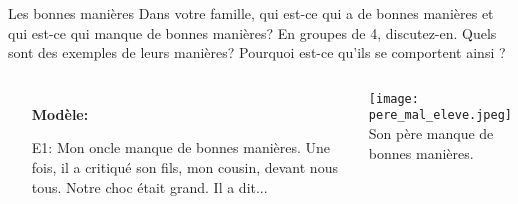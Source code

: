 \begin{frame}{Les bonnes manières}
  Dans votre famille, qui est-ce qui a de bonnes manières et qui est-ce qui manque de bonnes manières?
  En groupes de 4, discutez-en.
  Quels sont des exemples de leurs manières?
  Pourquoi est-ce qu'ils se comportent ainsi ?
  \begin{columns}
      \begin{itemize}
        \item[] \textbf{Modèle:}
        \item[E1:] \alert{Mon} oncle manque de bonnes manières. Une fois, il a critiqué \alert{son} fils, \alert{mon} cousin, devant nous tous. \alert{Notre} choc était grand. Il a dit...
      \end{itemize}
      \begin{center}
        \scriptsize
        \texttt{[image: pere\_mal\_eleve.jpeg]} \\
        Son père manque de bonnes manières.
      \end{center}
  \end{columns}
\end{frame}